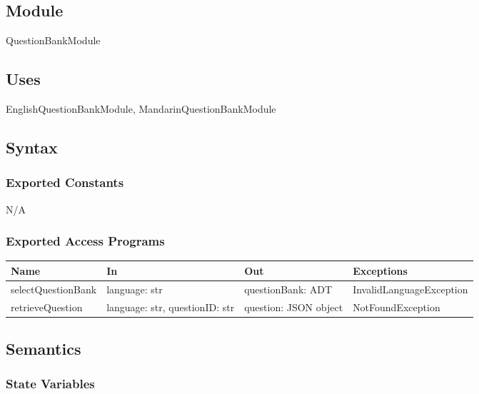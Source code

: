 \documentclass[12pt, titlepage]{article}
\begin{document}
\subsection{Module}

QuestionBankModule

\subsection{Uses}

EnglishQuestionBankModule, MandarinQuestionBankModule

\subsection{Syntax}

\subsubsection{Exported Constants}

N/A

\subsubsection{Exported Access Programs}

\begin{center}
\begin{tabular}{p{4cm} p{3cm} p{4cm} p{5cm}}
\hline
\textbf{Name} & \textbf{In} & \textbf{Out} & \textbf{Exceptions} \\
\hline
selectQuestionBank & \raggedright\arraybackslash language: str & \raggedright\arraybackslash questionBank: ADT & \raggedright\arraybackslash InvalidLanguageException \\
\hline
retrieveQuestion & \raggedright\arraybackslash language: str, questionID: str & \raggedright\arraybackslash question: JSON object & \raggedright\arraybackslash NotFoundException \\
\hline
\end{tabular}
\end{center}

\subsection{Semantics}

\subsubsection{State Variables}
\end{document}
